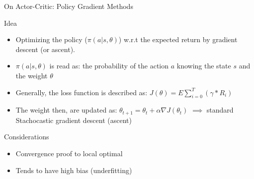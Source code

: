 \documentclass[presentation]{beamer}\mode<presentation>{\usetheme{AMSBolognaFC}}
\begin{document}
\begin{frame}{On Actor-Critic: Policy Gradient Methods}

	\begin{alertblock}{Idea}
		\begin{itemize}
			\item Optimizing the policy ($ \pi(a | s, \theta) $) w.r.t the expected return by gradient descent (or ascent).
			\item $\pi(a | s, \theta)$ is read as: the probability of the action $a$ knowing the state $s$ and the weight $\theta$
			\item Generally, the loss function is described as: $J(\theta) = E{\sum_{i = 0}^T}(\gamma * R_i)$
			\item The weight then, are updated as: $ \theta_{t+1} = \theta_t + \alpha \nabla J(\theta_t) $ $\implies$ standard Stachocastic gradient descent (ascent)
		\end{itemize}
	\end{alertblock}

	\begin{exampleblock}{Considerations}
		\begin{itemize}
			\item[{\color{teal} \faThumbsUp}] Convergence proof to local optimal
			\item[{\color{red}} \faThumbsDown] Tends to have high bias (underfitting)
		\end{itemize}
	\end{exampleblock}
\end{frame}
\end{document}
